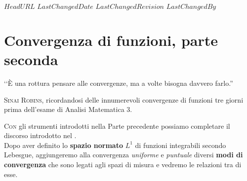 \svnidlong
{$HeadURL$}
{$LastChangedDate$}
{$LastChangedRevision$}
{$LastChangedBy$}

\chapter{Convergenza di funzioni, parte seconda}

\begin{introduction}
	‘‘È una rottura pensare alle convergenze, ma a volte bisogna davvero farlo.''
	\begin{flushright}
		\textsc{Sinai Robins,} ricordandosi delle innumerevoli convergenze di funzioni tre giorni prima dell'esame di Analisi Matematica 3.
	\end{flushright}
\end{introduction}
\lettrine[findent=1pt, nindent=0pt]{C}{on} gli strumenti introdotti nella Parte precedente possiamo completare il discorso introdotto nel .\\
Dopo aver definito lo \textbf{spazio normato} $L^1$ di funzioni integrabili secondo Lebesgue, aggiungeremo alla convergenza \textit{uniforme} e \textit{puntuale} diversi \textbf{modi di convergenza} che sono legati agli spazi di misura e vedremo le relazioni tra di esse.

